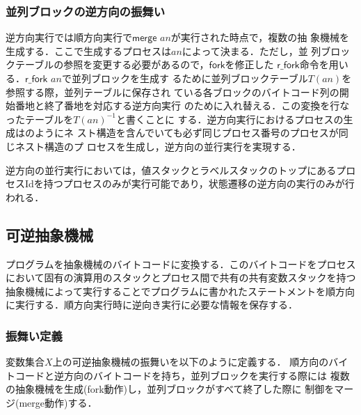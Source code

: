 \documentclass[submit,PRO]{ipsj}
\newcommand{\bcode}[1]{$\mathsf{#1}$}
\begin{document}
\subsubsection{並列ブロックの逆方向の振舞い}

逆方向実行では順方向実行で\bcode{merge} $an$が実行された時点で，複数の抽
象機械を生成する．ここで生成するプロセスは$an$によって決まる．ただし，並
列ブロックテーブルの参照を変更する必要があるので，\bcode{fork}を修正した
\bcode{r\_fork}命令を用いる．\bcode{r\_fork} $an$で並列ブロックを生成す
るために並列ブロックテーブル$T(an)$を参照する際，並列テーブルに保存され
ている各ブロックのバイトコード列の開始番地と終了番地を対応する逆方向実行
のために入れ替える．この変換を行なったテーブルを$T(an)^{-1}$と書くことに
する．逆方向実行におけるプロセスの生成はのようにネ
スト構造を含んでいても必ず同じプロセス番号のプロセスが同じネスト構造のプ
ロセスを生成し，逆方向の並行実行を実現する．

逆方向の並行実行においては，値スタックとラベルスタックのトップにあるプロ
セスIdを持つプロセスのみが実行可能であり，状態遷移の逆方向の実行のみが行
われる．

\subsection{可逆抽象機械}
\label{sec:format}

プログラムを抽象機械のバイトコードに変換する．このバイトコードをプロセス
において固有の演算用のスタックとプロセス間で共有の共有変数スタックを持つ
抽象機械によって実行することでプログラムに書かれたステートメントを順方向
に実行する．順方向実行時に逆向き実行に必要な情報を保存する．

\subsubsection{振舞い定義}

変数集合$X$上の可逆抽象機械の振舞いを以下のように定義する．
順方向のバイトコードと逆方向のバイトコードを持ち，並列ブロックを実行する際には
複数の抽象機械を生成(fork動作)し，並列ブロックがすべて終了した際に
制御をマージ(merge動作)する．
\end{document}
